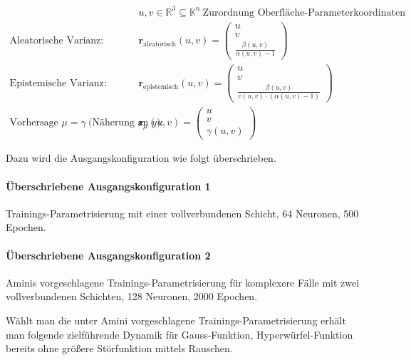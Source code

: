 \begin{otherlanguage}{ngerman}
\begin{small}
\[
\begin{aligned}
&u, v \in \mathbb{R}^{3} \subseteq \mathbb{K}^{n} \ \text{Zurordnung Oberfläche-Parameterkoordinaten} \\[0.5em]
\text{Aleatorische Varianz:} \quad
&\mathbf{r}_{\mathrm{aleatorisch}}(u,v) =
\begin{pmatrix}
u \\
v \\
\displaystyle \frac{\beta(u,v)}{\alpha(u,v) - 1}
\end{pmatrix}
\\[1.0em]
\text{Epistemische Varianz:} \quad
&\mathbf{r}_{\mathrm{epistemisch}}(u,v) =
\begin{pmatrix}
u \\
v \\
\displaystyle \frac{\beta(u,v)}{v(u,v) \cdot (\alpha(u,v) - 1)}
\end{pmatrix}
\\[1.0em]
\text{Vorhersage } \mu = \gamma \ \text{(Näherung an $y$):} \quad
&\mathbf{r}_{\mu}(u,v) =
\begin{pmatrix}
u \\
v \\
\gamma(u,v)
\end{pmatrix}
\end{aligned}
\]
\end{small}


Dazu wird die Ausgangskonfiguration wie folgt überschrieben.

\vspace{0.125\baselineskip}
\noindent

\paragraph{Überschriebene Ausgangskonfiguration 1} Trainings-Parametrisierung mit einer vollverbundenen Schicht, 64 Neuronen, 500 Epochen.

\paragraph{Überschriebene Ausgangskonfiguration 2} Aminis vorgeschlagene Trainings-Parametrisierung für komplexere Fälle mit zwei vollverbundenen Schichten, 128 Neuronen, 2000 Epochen.

\vspace{0.125\baselineskip}
\noindent

Wählt man die unter Amini vorgeschlagene Trainings-Parametrisierung erhält man folgende zielführende Dynamik für Gauss-Funktion, Hyperwürfel-Funktion bereits ohne größere Störfunktion mittels Rauschen.




\end{otherlanguage}
